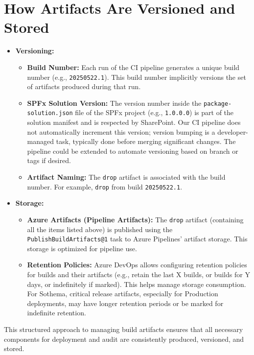 \section{How Artifacts Are Versioned and Stored}
\label{sec:ArtifactVersioningStorage}

\begin{itemize}
    \item \textbf{Versioning:}
    \begin{itemize}
        \item \textbf{Build Number:} Each run of the CI pipeline generates a unique build number (e.g., \texttt{20250522.1}). This build number implicitly versions the set of artifacts produced during that run.
        \item \textbf{SPFx Solution Version:} The version number inside the \texttt{package-solution.json} file of the SPFx project (e.g., \texttt{1.0.0.0}) is part of the solution manifest and is respected by SharePoint. Our CI pipeline does not automatically increment this version; version bumping is a developer-managed task, typically done before merging significant changes. The pipeline could be extended to automate versioning based on branch or tags if desired.
        \item \textbf{Artifact Naming:} The \texttt{drop} artifact is associated with the build number. For example, \texttt{drop} from build \texttt{20250522.1}.
    \end{itemize}
    \item \textbf{Storage:}
    \begin{itemize}
        \item \textbf{Azure Artifacts (Pipeline Artifacts):} The \texttt{drop} artifact (containing all the items listed above) is published using the \texttt{PublishBuildArtifacts@1} task to Azure Pipelines' artifact storage. This storage is optimized for pipeline use.
        \item \textbf{Retention Policies:} Azure DevOps allows configuring retention policies for builds and their artifacts (e.g., retain the last X builds, or builds for Y days, or indefinitely if marked). This helps manage storage consumption. For Sothema, critical release artifacts, especially for Production deployments, may have longer retention periods or be marked for indefinite retention.
    \end{itemize}
\end{itemize}

This structured approach to managing build artifacts ensures that all necessary components for deployment and audit are consistently produced, versioned, and stored.

